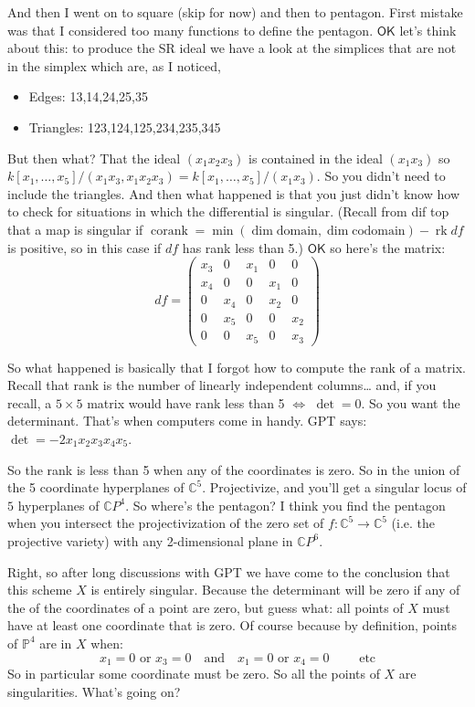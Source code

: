 And then I went on to square (skip for now) and then to pentagon. First mistake was that I considered too many functions to define the pentagon. \(\mathsf{OK}\) let's think about this: to produce the SR ideal we have a look at the simplices that are not in the simplex which are, as I noticed,
\begin{itemize}
	\item Edges: 13,14,24,25,35
	\item Triangles: 123,124,125,234,235,345
\end{itemize}
But then what? That the ideal \((x_1x_2x_3)\) is contained in the ideal \((x_1x_3)\) so \(k[x_1,\ldots,x_5]/(x_1x_3,x_1x_2x_3)=k[x_1,\ldots,x_5]/(x_1x_3)\). So you didn't need to include the triangles. And then what happened is that you just didn't know how to check for situations in which the differential is singular. (Recall from dif top that a map is singular if \(\operatorname{corank}=\operatorname{min}(\dim \text{domain},\dim \text{codomain})  -\operatorname{rk} df\) is positive, so in this case if \(df\) has rank less than 5.) \(\mathsf{OK}\) so here's the matrix:
	\[df=\begin{pmatrix} x_3&0&x_1&0&0\\x_4&0&0&x_1&0\\0&x_4&0&x_2&0\\0&x_5&0&0&x_2\\0&0&x_5&0&x_3\end{pmatrix} \]

So what happened is basically that I forgot how to compute the rank of a matrix. Recall that rank is the number of linearly independent columns… and, if you recall, a \(5 \times 5\) matrix would have rank less than 5 \(\iff\) \(\det =0\). So you want the determinant. That's when computers come in handy. GPT says: \(\det=-2x_1x_2x_3x_4x_5\).

So the rank is less than 5 when any of the coordinates is zero. So in the union of the 5 coordinate hyperplanes of \(\mathbb{C}^5\). Projectivize, and you'll get a singular locus of \(5\) hyperplanes of \(\mathbb{C}P^{4}\). So where's the pentagon? I think you find the pentagon when you intersect the projectivization of the zero set of \(f:\mathbb{C}^5\to \mathbb{C}^5\) (i.e. the projective variety) with any 2-dimensional plane in \(\mathbb{C}P^{6}\).

Right, so after long discussions with GPT we have come to the conclusion that this scheme \(X\) is entirely singular. Because the determinant will be zero if any of the of the coordinates of a point are zero, but guess what: all points of \(X\) must have at least one coordinate that is zero. Of course because by definition, points of \(\mathbb{P}^4\) are in \(X\) when:
\[x_1=0\text{ or } x_3=0\quad\text{and}\quad   x_1=0\text{ or } x_4=0\qquad \text{ etc} \]
So in particular some coordinate must be zero. So all the points of \(X\) are singularities. What's going on?

